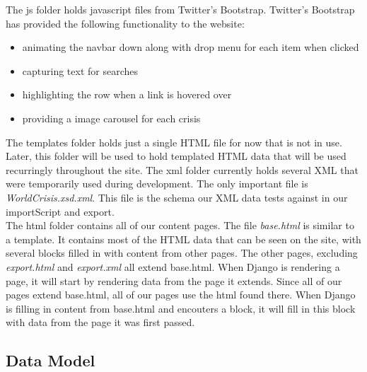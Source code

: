 \documentclass[12pt]{report}
\begin{document}
The js folder holds javascript files from Twitter's Bootstrap. Twitter's Bootstrap has provided the following functionality to the website:
\begin{itemize}
\item animating the navbar down along with drop menu for each item when clicked
\item capturing text for searches
\item highlighting the row when a link is hovered over
\item providing a image  carousel for each crisis 
\end{itemize}

The templates folder holds just a single HTML file for now that is not in use.
Later, this folder will be used to hold templated HTML data that will be used recurringly throughout the site.
The xml folder currently holds several XML that were temporarily used during development.
The only important file is \emph{WorldCrisis.xsd.xml}.
This file is the schema our XML data tests against in our importScript and export.\\


The html folder contains all of our content pages.
The file \emph{base.html} is similar to a template.
It contains most of the HTML data that can be seen on the site, with several blocks filled in with content from other pages.
The other pages, excluding \emph{export.html} and \emph{export.xml} all extend base.html.
When Django is rendering a page, it will start by rendering data from the page it extends.
Since all of our pages extend base.html, all of our pages use the html found there.
When Django is filling in content from base.html and encouters a block,
it will fill in this block with data from the page it was first passed.\\

\newpage
\subsection*{Data Model}
\hfill
\end{document}
